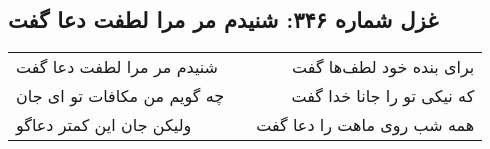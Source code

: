 \begin{center}
\section*{غزل شماره ۳۴۶: شنیدم مر مرا لطفت دعا گفت}
\label{sec:0346}
\begin{longtable}{l p{0.5cm} r}
شنیدم مر مرا لطفت دعا گفت
&&
برای بنده خود لطف‌ها گفت
\\
چه گویم من مکافات تو ای جان
&&
که نیکی تو را جانا خدا گفت
\\
ولیکن جان این کمتر دعاگو
&&
همه شب روی ماهت را دعا گفت
\\
\end{longtable}
\end{center}
